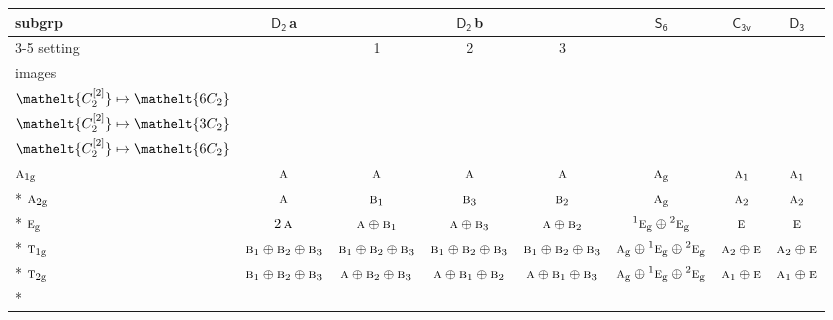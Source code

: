 \documentclass[10pt,a4paper]{article}
\numberwithin{equation}{section}
\newcommand{\eltfont}[1]{{\let\sigma\eltsigma\mathelt{#1}}}
\newcommand{\grp}[1]{\mathsf{#1}}
\newcommand{\irr}[1]{\text{\normalfont\scshape #1}}
\newcommand{\conjpair}[1]{{}^{#1}}
\newcommand{\cls}[1]{\eltfont{#1}}
\newcommand{\ptag}[1]{\mathrm{#1}}
\newcommand{\clsletter}[1]{\,{\scriptsize\color{black!55}#1}}
\newcommand{\genidx}[2]{#1^{[\mathrm{#2}]}}
\begin{document}
{\small\begin{longtable}{@{}lccccccc@{}}\toprule
subgrp & \href{D2.pdf}{$\grp{D_{2}}$}\clsletter{a} & \multicolumn{3}{c}{\href{D2.pdf}{$\grp{D_{2}}$}\clsletter{b}} & \href{S6.pdf}{$\grp{S_{6}}$} & \href{C3v.pdf}{$\grp{C_{3v}}$} & \href{D3.pdf}{$\grp{D_{3}}$}\\\cmidrule(lr){3-5}
setting &  & 1 & 2 & 3 &  &  & \\
images &  & {\scriptsize\begin{tabular}[t]{@{}c@{}}$\cls{\genidx{C_{2}}{1}} \mapsto \cls{3C_{2}}$\\$\cls{\genidx{C_{2}}{2}} \mapsto \cls{6C_{2}}$\end{tabular}} & {\scriptsize\begin{tabular}[t]{@{}c@{}}$\cls{\genidx{C_{2}}{1}} \mapsto \cls{6C_{2}}$\\$\cls{\genidx{C_{2}}{2}} \mapsto \cls{3C_{2}}$\end{tabular}} & {\scriptsize\begin{tabular}[t]{@{}c@{}}$\cls{\genidx{C_{2}}{1}} \mapsto \cls{6C_{2}}$\\$\cls{\genidx{C_{2}}{2}} \mapsto \cls{6C_{2}}$\end{tabular}} &  &  & \\\midrule\endhead
\bottomrule\endfoot\endlastfoot
$\irr{a}_{1\ptag{g}}$ & $\irr{a}$ & $\irr{a}$ & $\irr{a}$ & $\irr{a}$ & $\irr{a}_{\ptag{g}}$ & $\irr{a}_{1}$ & $\irr{a}_{1}$\\*
$\irr{a}_{2\ptag{g}}$ & $\irr{a}$ & $\irr{b}_{1}$ & $\irr{b}_{3}$ & $\irr{b}_{2}$ & $\irr{a}_{\ptag{g}}$ & $\irr{a}_{2}$ & $\irr{a}_{2}$\\*
$\irr{e}_{\ptag{g}}$ & $2\,\irr{a}$ & $\irr{a}\oplus \irr{b}_{1}$ & $\irr{a}\oplus \irr{b}_{3}$ & $\irr{a}\oplus \irr{b}_{2}$ & $\conjpair{1}\irr{e}_{\ptag{g}}\oplus \conjpair{2}\irr{e}_{\ptag{g}}$ & $\irr{e}$ & $\irr{e}$\\*
$\irr{t}_{1\ptag{g}}$ & $\irr{b}_{1}\oplus \irr{b}_{2}\oplus \irr{b}_{3}$ & $\irr{b}_{1}\oplus \irr{b}_{2}\oplus \irr{b}_{3}$ & $\irr{b}_{1}\oplus \irr{b}_{2}\oplus \irr{b}_{3}$ & $\irr{b}_{1}\oplus \irr{b}_{2}\oplus \irr{b}_{3}$ & $\irr{a}_{\ptag{g}}\oplus \conjpair{1}\irr{e}_{\ptag{g}}\oplus \conjpair{2}\irr{e}_{\ptag{g}}$ & $\irr{a}_{2}\oplus \irr{e}$ & $\irr{a}_{2}\oplus \irr{e}$\\*
$\irr{t}_{2\ptag{g}}$ & $\irr{b}_{1}\oplus \irr{b}_{2}\oplus \irr{b}_{3}$ & $\irr{a}\oplus \irr{b}_{2}\oplus \irr{b}_{3}$ & $\irr{a}\oplus \irr{b}_{1}\oplus \irr{b}_{2}$ & $\irr{a}\oplus \irr{b}_{1}\oplus \irr{b}_{3}$ & $\irr{a}_{\ptag{g}}\oplus \conjpair{1}\irr{e}_{\ptag{g}}\oplus \conjpair{2}\irr{e}_{\ptag{g}}$ & $\irr{a}_{1}\oplus \irr{e}$ & $\irr{a}_{1}\oplus \irr{e}$\\*

\end{longtable}}
\end{document}
